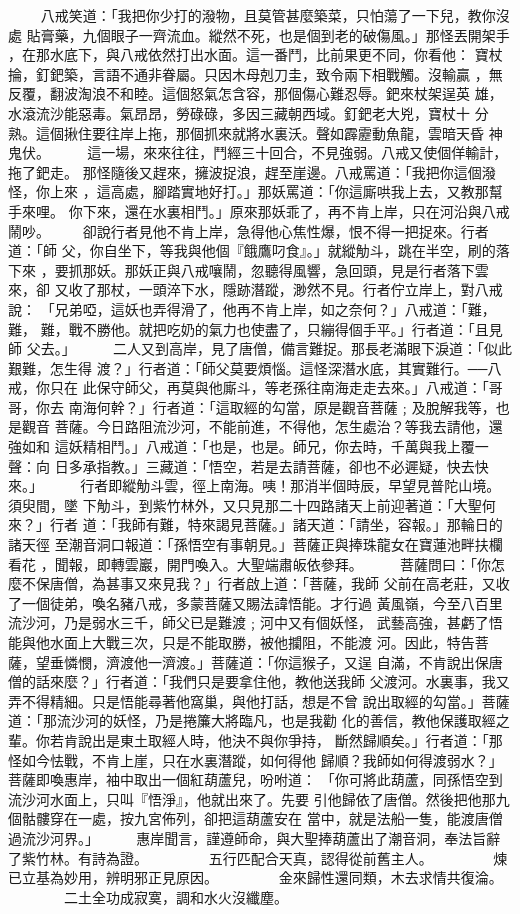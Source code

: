 \begin{pinyinscope}
{　　
八戒笑道：「我把你少打的潑物，且莫管甚麼築菜，只怕蕩了一下兒，教你沒處
貼膏藥，九個眼子一齊流血。縱然不死，也是個到老的破傷風。」那怪丟開架手
，在那水底下，與八戒依然打出水面。這一番鬥，比前果更不同，你看他：
寶杖掄，釘鈀築，言語不通非眷屬。只因木母剋刀圭，致令兩下相戰觸。沒輸贏
，無反覆，翻波淘浪不和睦。這個怒氣怎含容，那個傷心難忍辱。鈀來杖架逞英
雄，水滾流沙能惡毒。氣昂昂，勞碌碌，多因三藏朝西域。釘鈀老大兇，寶杖十
分熟。這個揪住要往岸上拖，那個抓來就將水裏沃。聲如霹靂動魚龍，雲暗天昏
神鬼伏。
　　
這一場，來來往往，鬥經三十回合，不見強弱。八戒又使個佯輸計，拖了鈀走。
那怪隨後又趕來，擁波捉浪，趕至崖邊。八戒罵道：「我把你這個潑怪，你上來
，這高處，腳踏實地好打。」那妖罵道：「你這廝哄我上去，又教那幫手來哩。
你下來，還在水裏相鬥。」原來那妖乖了，再不肯上岸，只在河沿與八戒鬧吵。
　　卻說行者見他不肯上岸，急得他心焦性爆，恨不得一把捉來。行者道：「師
父，你自坐下，等我與他個『餓鷹叼食』。」就縱觔斗，跳在半空，刷的落下來
，要抓那妖。那妖正與八戒嚷鬧，忽聽得風響，急回頭，見是行者落下雲來，卻
又收了那杖，一頭淬下水，隱跡潛蹤，渺然不見。行者佇立岸上，對八戒說：
「兄弟啞，這妖也弄得滑了，他再不肯上岸，如之奈何？」八戒道：「難，難，
難，戰不勝他。就把吃奶的氣力也使盡了，只繃得個手平。」行者道：「且見師
父去。」
　　
二人又到高岸，見了唐僧，備言難捉。那長老滿眼下淚道：「似此艱難，怎生得
渡？」行者道：「師父莫要煩惱。這怪深潛水底，其實難行。──八戒，你只在
此保守師父，再莫與他廝斗，等老孫往南海走走去來。」八戒道：「哥哥，你去
南海何幹？」行者道：「這取經的勾當，原是觀音菩薩﹔及脫解我等，也是觀音
菩薩。今日路阻流沙河，不能前進，不得他，怎生處治？等我去請他，還強如和
這妖精相鬥。」八戒道：「也是，也是。師兄，你去時，千萬與我上覆一聲：向
日多承指教。」三藏道：「悟空，若是去請菩薩，卻也不必遲疑，快去快來。」
　　
行者即縱觔斗雲，徑上南海。咦！那消半個時辰，早望見普陀山境。須臾間，墜
下觔斗，到紫竹林外，又只見那二十四路諸天上前迎著道：「大聖何來？」行者
道：「我師有難，特來謁見菩薩。」諸天道：「請坐，容報。」那輪日的諸天徑
至潮音洞口報道：「孫悟空有事朝見。」菩薩正與捧珠龍女在寶蓮池畔扶欄看花
，聞報，即轉雲巖，開門喚入。大聖端肅皈依參拜。
　　
菩薩問曰：「你怎麼不保唐僧，為甚事又來見我？」行者啟上道：「菩薩，我師
父前在高老莊，又收了一個徒弟，喚名豬八戒，多蒙菩薩又賜法諱悟能。才行過
黃風嶺，今至八百里流沙河，乃是弱水三千，師父已是難渡﹔河中又有個妖怪，
武藝高強，甚虧了悟能與他水面上大戰三次，只是不能取勝，被他攔阻，不能渡
河。因此，特告菩薩，望垂憐憫，濟渡他一濟渡。」菩薩道：「你這猴子，又逞
自滿，不肯說出保唐僧的話來麼？」行者道：「我們只是要拿住他，教他送我師
父渡河。水裏事，我又弄不得精細。只是悟能尋著他窩巢，與他打話，想是不曾
說出取經的勾當。」菩薩道：「那流沙河的妖怪，乃是捲簾大將臨凡，也是我勸
化的善信，教他保護取經之輩。你若肯說出是東土取經人時，他決不與你爭持，
斷然歸順矣。」行者道：「那怪如今怯戰，不肯上崖，只在水裏潛蹤，如何得他
歸順？我師如何得渡弱水？」菩薩即喚惠岸，袖中取出一個紅葫蘆兒，吩咐道：
「你可將此葫蘆，同孫悟空到流沙河水面上，只叫『悟淨』，他就出來了。先要
引他歸依了唐僧。然後把他那九個骷髏穿在一處，按九宮佈列，卻把這葫蘆安在
當中，就是法船一隻，能渡唐僧過流沙河界。」
　　
惠岸聞言，謹遵師命，與大聖捧葫蘆出了潮音洞，奉法旨辭了紫竹林。有詩為證。
　　　　五行匹配合天真，認得從前舊主人。
　　　　煉已立基為妙用，辨明邪正見原因。
　　　　金來歸性還同類，木去求情共復淪。
　　　　二土全功成寂寞，調和水火沒纖塵。

}
\end{pinyinscope}
